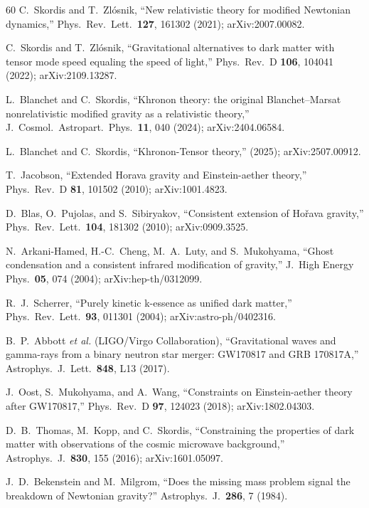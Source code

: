 \documentclass[prd,twocolumn,superscriptaddress,longbibliography,floatfix]{revtex4-2}
\begin{document}
\begin{thebibliography}{60}
C.~Skordis and T.~Zl\'{o}snik,
``New relativistic theory for modified Newtonian dynamics,''
Phys.\ Rev.\ Lett.\ \textbf{127}, 161302 (2021);
arXiv:2007.00082.

C.~Skordis and T.~Zl\'{o}snik,
``Gravitational alternatives to dark matter with tensor mode
speed equaling the speed of light,''
Phys.\ Rev.\ D \textbf{106}, 104041 (2022);
arXiv:2109.13287.

L.~Blanchet and C.~Skordis,
``Khronon theory: the original Blanchet--Marsat nonrelativistic
modified gravity as a relativistic theory,''
J.\ Cosmol.\ Astropart.\ Phys.\ \textbf{11}, 040 (2024);
arXiv:2404.06584.

L.~Blanchet and C.~Skordis,
``Khronon-Tensor theory,''
(2025); arXiv:2507.00912.

T.~Jacobson,
``Extended Horava gravity and Einstein-aether theory,''
Phys.\ Rev.\ D \textbf{81}, 101502 (2010);
arXiv:1001.4823.

D.~Blas, O.~Pujolas, and S.~Sibiryakov,
``Consistent extension of Ho\v{r}ava gravity,''
Phys.\ Rev.\ Lett.\ \textbf{104}, 181302 (2010);
arXiv:0909.3525.

N.~Arkani-Hamed, H.-C.~Cheng, M.~A.~Luty, and S.~Mukohyama,
``Ghost condensation and a consistent infrared modification
of gravity,''
J.\ High Energy Phys.\ \textbf{05}, 074 (2004);
arXiv:hep-th/0312099.

R.~J.~Scherrer,
``Purely kinetic k-essence as unified dark matter,''
Phys.\ Rev.\ Lett.\ \textbf{93}, 011301 (2004);
arXiv:astro-ph/0402316.

B.~P.~Abbott \emph{et al.} (LIGO/Virgo Collaboration),
``Gravitational waves and gamma-rays from a binary neutron star
merger: GW170817 and GRB 170817A,''
Astrophys.\ J.\ Lett.\ \textbf{848}, L13 (2017).

J.~Oost, S.~Mukohyama, and A.~Wang,
``Constraints on Einstein-aether theory after GW170817,''
Phys.\ Rev.\ D \textbf{97}, 124023 (2018);
arXiv:1802.04303.

D.~B.~Thomas, M.~Kopp, and C.~Skordis,
``Constraining the properties of dark matter with observations
of the cosmic microwave background,''
Astrophys.\ J.\ \textbf{830}, 155 (2016);
arXiv:1601.05097.

J.~D.~Bekenstein and M.~Milgrom,
``Does the missing mass problem signal the breakdown of
Newtonian gravity?''
Astrophys.\ J.\ \textbf{286}, 7 (1984).


\end{thebibliography}
\end{document}
